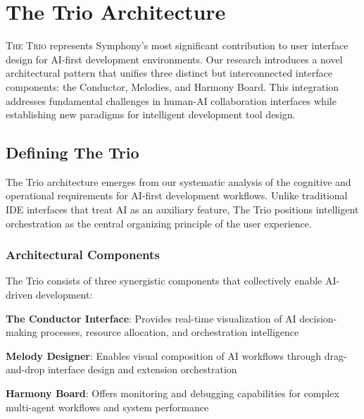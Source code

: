 
\section*{The Trio Architecture}

\vspace{0.3cm}
\lettrine{T}{he Trio} represents Symphony's most significant contribution to user interface design for AI-first development environments. Our research introduces a novel architectural pattern that unifies three distinct but interconnected interface components: the Conductor, Melodies, and Harmony Board. This integration addresses fundamental challenges in human-AI collaboration interfaces while establishing new paradigms for intelligent development tool design.

\vspace{0.2cm}
\subsection*{Defining The Trio}

The Trio architecture emerges from our systematic analysis of the cognitive and operational requirements for AI-first development workflows. Unlike traditional IDE interfaces that treat AI as an auxiliary feature, The Trio positions intelligent orchestration as the central organizing principle of the user experience.

\subsubsection*{Architectural Components}

The Trio consists of three synergistic components that collectively enable AI-driven development:

\begin{expandedlist}
    \item \textbf{The Conductor Interface}: Provides real-time visualization of AI decision-making processes, resource allocation, and orchestration intelligence
    \item \textbf{Melody Designer}: Enables visual composition of AI workflows through drag-and-drop interface design and extension orchestration
    \item \textbf{Harmony Board}: Offers monitoring and debugging capabilities for complex multi-agent workflows and system performance
\end{expandedlist}

